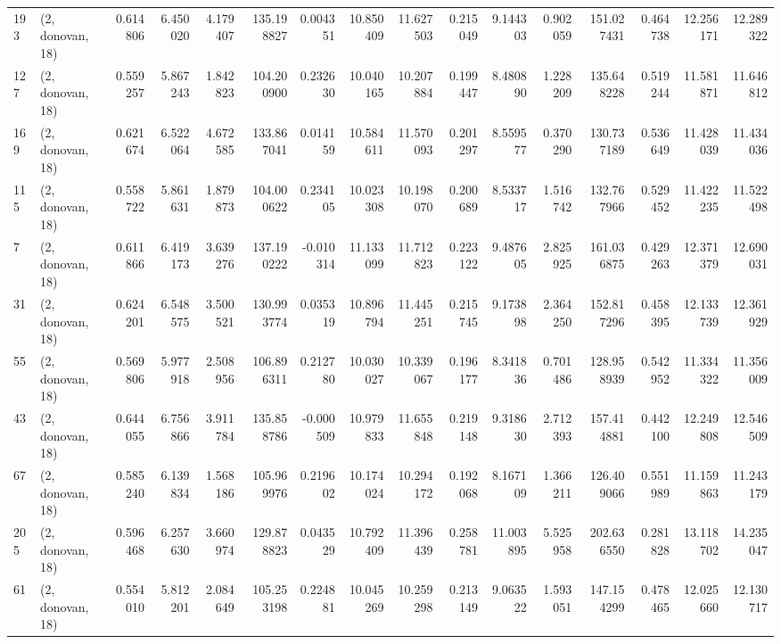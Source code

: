 \begin{tabular}{llrrrrrrrrrrrrrr}
193 &  (2, donovan, 18) &   0.614806 &   6.450020 &   4.179407 &   135.198827 &   0.004351 &  10.850409 &  11.627503 &  0.215049 &   9.144303 &   0.902059 &   151.027431 &  0.464738 &  12.256171 &  12.289322 \\
127 &  (2, donovan, 18) &   0.559257 &   5.867243 &   1.842823 &   104.200900 &   0.232630 &  10.040165 &  10.207884 &  0.199447 &   8.480890 &   1.228209 &   135.648228 &  0.519244 &  11.581871 &  11.646812 \\
169 &  (2, donovan, 18) &   0.621674 &   6.522064 &   4.672585 &   133.867041 &   0.014159 &  10.584611 &  11.570093 &  0.201297 &   8.559577 &   0.370290 &   130.737189 &  0.536649 &  11.428039 &  11.434036 \\
115 &  (2, donovan, 18) &   0.558722 &   5.861631 &   1.879873 &   104.000622 &   0.234105 &  10.023308 &  10.198070 &  0.200689 &   8.533717 &   1.516742 &   132.767966 &  0.529452 &  11.422235 &  11.522498 \\
7   &  (2, donovan, 18) &   0.611866 &   6.419173 &   3.639276 &   137.190222 &  -0.010314 &  11.133099 &  11.712823 &  0.223122 &   9.487605 &   2.825925 &   161.036875 &  0.429263 &  12.371379 &  12.690031 \\
31  &  (2, donovan, 18) &   0.624201 &   6.548575 &   3.500521 &   130.993774 &   0.035319 &  10.896794 &  11.445251 &  0.215745 &   9.173898 &   2.364250 &   152.817296 &  0.458395 &  12.133739 &  12.361929 \\
55  &  (2, donovan, 18) &   0.569806 &   5.977918 &   2.508956 &   106.896311 &   0.212780 &  10.030027 &  10.339067 &  0.196177 &   8.341836 &   0.701486 &   128.958939 &  0.542952 &  11.334322 &  11.356009 \\
43  &  (2, donovan, 18) &   0.644055 &   6.756866 &   3.911784 &   135.858786 &  -0.000509 &  10.979833 &  11.655848 &  0.219148 &   9.318630 &   2.712393 &   157.414881 &  0.442100 &  12.249808 &  12.546509 \\
67  &  (2, donovan, 18) &   0.585240 &   6.139834 &   1.568186 &   105.969976 &   0.219602 &  10.174024 &  10.294172 &  0.192068 &   8.167109 &   1.366211 &   126.409066 &  0.551989 &  11.159863 &  11.243179 \\
205 &  (2, donovan, 18) &   0.596468 &   6.257630 &   3.660974 &   129.878823 &   0.043529 &  10.792409 &  11.396439 &  0.258781 &  11.003895 &   5.525958 &   202.636550 &  0.281828 &  13.118702 &  14.235047 \\
61  &  (2, donovan, 18) &   0.554010 &   5.812201 &   2.084649 &   105.253198 &   0.224881 &  10.045269 &  10.259298 &  0.213149 &   9.063522 &   1.593051 &   147.154299 &  0.478465 &  12.025660 &  12.130717 \\

\end{tabular}

